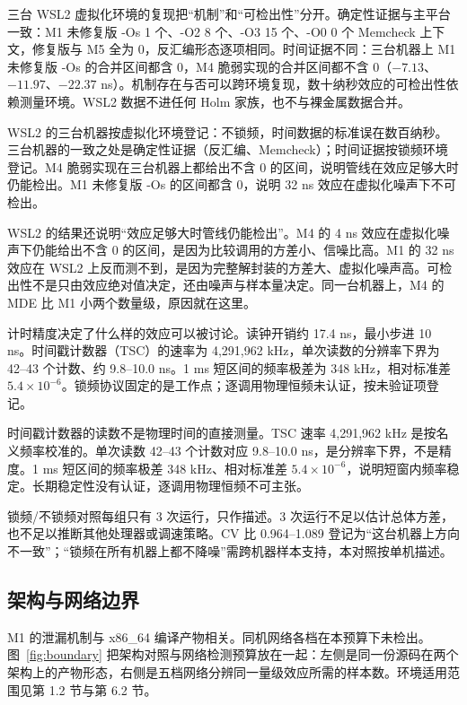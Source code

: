 三台 WSL2 虚拟化环境的复现把“机制”和“可检出性”分开。确定性证据与主平台一致：M1 未修复版 -Os 1 个、-O2 8 个、-O3 15 个、-O0 0 个 Memcheck 上下文，修复版与 M5 全为 0，反汇编形态逐项相同。时间证据不同：三台机器上 M1 未修复版 -Os 的合并区间都含 0，M4 脆弱实现的合并区间都不含 0（$-7.13$、$-11.97$、$-22.37$ ns）。机制存在与否可以跨环境复现，数十纳秒效应的可检出性依赖测量环境。WSL2 数据不进任何 Holm 家族，也不与裸金属数据合并。%

WSL2 的三台机器按虚拟化环境登记：不锁频，时间数据的标准误在数百纳秒。三台机器的一致之处是确定性证据（反汇编、Memcheck）；时间证据按锁频环境登记。M4 脆弱实现在三台机器上都给出不含 0 的区间，说明管线在效应足够大时仍能检出。M1 未修复版 -Os 的区间都含 0，说明 32 ns 效应在虚拟化噪声下不可检出。

WSL2 的结果还说明“效应足够大时管线仍能检出”。M4 的 4 ns 效应在虚拟化噪声下仍能给出不含 0 的区间，是因为比较调用的方差小、信噪比高。M1 的 32 ns 效应在 WSL2 上反而测不到，是因为完整解封装的方差大、虚拟化噪声高。可检出性不是只由效应绝对值决定，还由噪声与样本量决定。同一台机器上，M4 的 MDE 比 M1 小两个数量级，原因就在这里。

计时精度决定了什么样的效应可以被讨论。读钟开销约 17.4 ns，最小步进 10 ns。时间戳计数器（TSC）的速率为 4,291,962 kHz，单次读数的分辨率下界为 42--43 个计数、约 9.8--10.0 ns。1 ms 短区间的频率极差为 348 kHz，相对标准差 $5.4\times10^{-6}$。锁频协议固定的是工作点；逐调用物理恒频未认证，按未验证项登记。%

时间戳计数器的读数不是物理时间的直接测量。TSC 速率 4,291,962 kHz 是按名义频率校准的。单次读数 42--43 个计数对应 9.8--10.0 ns，是分辨率下界，不是精度。1 ms 短区间的频率极差 348 kHz、相对标准差 $5.4\times10^{-6}$，说明短窗内频率稳定。长期稳定性没有认证，逐调用物理恒频不可主张。

锁频/不锁频对照每组只有 3 次运行，只作描述。3 次运行不足以估计总体方差，也不足以推断其他处理器或调速策略。CV 比 0.964--1.089 登记为“这台机器上方向不一致”；“锁频在所有机器上都不降噪”需跨机器样本支持，本对照按单机描述。



\subsection{架构与网络边界}

M1 的泄漏机制与 x86\_64 编译产物相关。同机网络各档在本预算下未检出。图~\ref{fig:boundary} 把架构对照与网络检测预算放在一起：左侧是同一份源码在两个架构上的产物形态，右侧是五档网络分辨同一量级效应所需的样本数。环境适用范围见第 1.2 节与第 6.2 节。%

